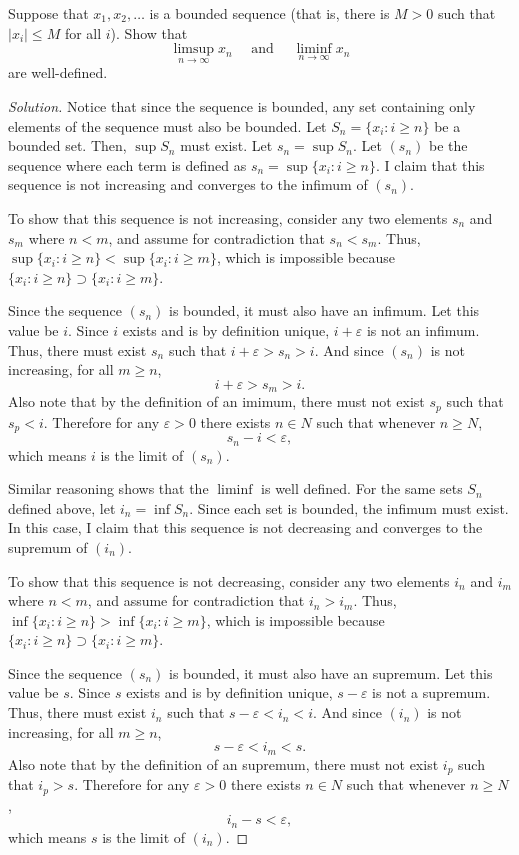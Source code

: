 \documentclass[11pt,letterpaper]{article}
\newcommand{\eps}{\varepsilon}
\renewcommand{\epsilon}{\eps}
\newenvironment{prob}[1]
  {\renewcommand\theinnerprob{#1}\innerprob}
  {\endinnerprob}
\newenvironment{solution}
  {\renewcommand\qedsymbol{}\begin{proof}[Solution]}
  {\end{proof}\bigskip}
\begin{document}
\begin{prob}{2}  %
Suppose that $x_1, x_2, \dots$ is a bounded sequence (that is, there is $M>0$ such that $|x_i| \leq M$ for all $i$).  Show that
\[
	\limsup_{n\to\infty} x_n
		\quad\text{ and }\quad
	\liminf_{n\to\infty} x_n
\]
are well-defined.
\end{prob}
\begin{solution}
	Notice that since the sequence is bounded, any set containing only elements of the sequence must also be bounded. Let $S_n = \{ x_i : i \geq n\}$ be a bounded set. Then, $\sup S_n$ must exist. Let $s_n = \sup S_n$. Let $(s_n)$ be the sequence where each term is defined as $s_n = \sup\{ x_i : i \geq n\}$. I claim that this sequence is not increasing and converges to the infimum of $(s_n)$. 
	
	To show that this sequence is not increasing, consider any two elements $s_n$ and $s_m$ where $n < m$, and assume for contradiction that $s_n < s_m$. Thus, $\sup \{ x_i : i \geq n\} < \sup \{ x_i : i \geq m\}$, which is impossible because $\{ x_i : i \geq n\} \supset \{ x_i : i \geq m\}$.
	
	Since the sequence $(s_n)$ is bounded, it must also have an infimum. Let this value be $i$. Since $i$ exists and is by definition unique, $i+\epsilon$ is not an infimum. Thus, there must exist $s_n$ such that $i + \epsilon > s_n > i$. And since $(s_n)$ is not increasing, for all $m\geq n$, $$i + \epsilon > s_m > i.$$ Also note that by the definition of an imimum, there must not exist $s_p$ such that $s_p < i$. Therefore for any $\epsilon > 0$ there exists $n\in N$ such that whenever $n \geq N$, $$s_n - i < \epsilon,$$ which means $i$ is the limit of $(s_n)$.
	
	Similar reasoning shows that the $\liminf$ is well defined. For the same sets $S_n$ defined above, let $i_n = \inf S_n$. Since each set is bounded, the infimum must exist. In this case, I claim that this sequence is not decreasing and converges to the supremum of $(i_n)$. 
	
	To show that this sequence is not decreasing, consider any two elements $i_n$ and $i_m$ where $n < m$, and assume for contradiction that $i_n > i_m$. Thus, $\inf \{ x_i : i \geq n\} > \inf \{ x_i : i \geq m\}$, which is impossible because $\{ x_i : i \geq n\} \supset \{ x_i : i \geq m\}$.
	
	Since the sequence $(s_n)$ is bounded, it must also have an supremum. Let this value be $s$. Since $s$ exists and is by definition unique, $s-\epsilon$ is not a supremum. Thus, there must exist $i_n$ such that $s - \epsilon < i_n < i$. And since $(i_n)$ is not increasing, for all $m\geq n$, $$s - \epsilon < i_m < s.$$ Also note that by the definition of an supremum, there must not exist $i_p$ such that $i_p > s$. Therefore for any $\epsilon > 0$ there exists $n\in N$ such that whenever $n \geq N$, $$i_n - s < \epsilon,$$ which means $s$ is the limit of $(i_n)$.
\end{solution}
\newpage
\end{document}
